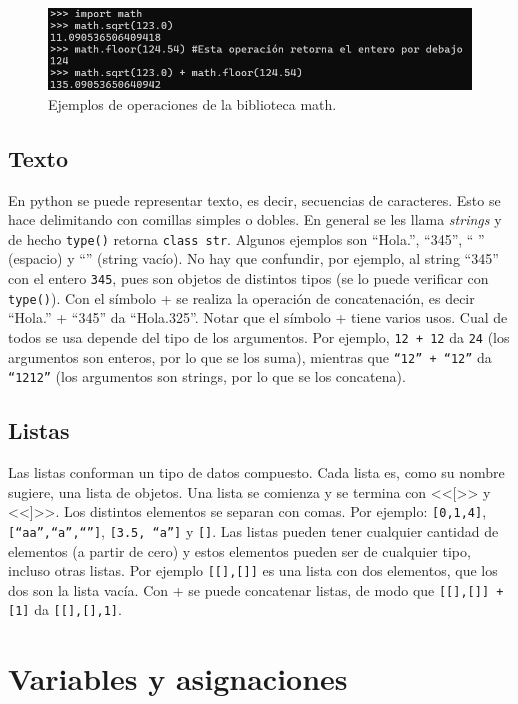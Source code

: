 \documentclass[a4paper, 12pt]{report}
\theoremstyle{definition}
\begin{document}
\begin{figure}
	\centering
	\includegraphics[scale=0.6]{ejemploMath.png}
	\caption{Ejemplos de operaciones de la biblioteca math.}
	\label{fig-ejemploMath}
\end{figure}


\subsection{Texto}

En python se puede representar texto, es decir, secuencias de caracteres. Esto se hace delimitando con comillas simples o dobles. En general se les llama {\sl strings} y de hecho {\tt type()} retorna {\tt class str}. Algunos ejemplos son ``Hola.'', ``345'', `` '' (espacio)  y ``'' (string vacío). No hay que confundir, por ejemplo, al string ``345'' con el entero {\tt 345}, pues son objetos de distintos tipos (se lo puede verificar con {\tt type()}). Con el símbolo + se realiza la operación de concatenación, es decir ``Hola.'' + ``345'' da ``Hola.325''. Notar que el símbolo + tiene varios usos. Cual de todos se usa depende del tipo de los argumentos. Por ejemplo, {\tt 12 + 12} da {\tt 24} (los argumentos son enteros, por lo que se los suma), mientras que {\tt ``12'' + ``12''} da {\tt ``1212''} (los argumentos son strings, por lo que se los concatena).

\subsection{Listas}

Las listas conforman un tipo de datos compuesto. Cada lista es, como su nombre sugiere, una lista de objetos. Una lista se comienza y se termina con <<[>> y <<]>>. Los distintos elementos se separan con comas. Por ejemplo: {\tt[0,1,4]}, {\tt[``aa'',``a'',``'']}, {\tt [3.5, ``a'']} y {\tt[]}. Las listas pueden tener cualquier cantidad de elementos (a partir de cero) y estos elementos pueden ser de cualquier tipo, incluso otras listas. Por ejemplo {\tt [[],[]]} es una lista con dos elementos, que los dos son la lista vacía. Con + se puede concatenar listas, de modo que {\tt [[],[]] + [1]} da {\tt [[],[],1]}.


\section{Variables y asignaciones}
\end{document}
